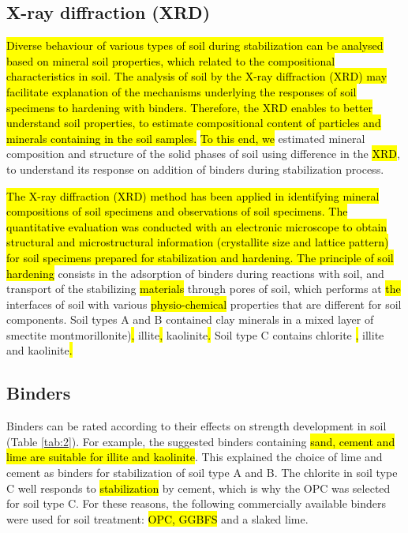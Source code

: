 \documentclass[electronics,article,submit,pdftex,moreauthors]{Definitions/mdpi}
\begin{document}

\subsection{X-ray diffraction (XRD)}
\hl{Diverse behaviour of various types of soil during stabilization can be analysed based on mineral soil properties, which related to the compositional characteristics in soil. The analysis of soil by the X-ray diffraction (XRD) may facilitate explanation of the mechanisms underlying the responses of soil specimens to hardening with binders. Therefore, the XRD enables to better understand soil properties, to estimate compositional content of particles and minerals containing in the soil samples. }\hl{To this end, we} estimated\hl{ }mineral composition and structure of the solid phases of soil\hl{ }using\hl{ }difference in the \hl{XRD}, to understand its response on addition of binders during stabilization process. 

\hl{The X-ray diffraction (XRD) method has been applied in identifying mineral compositions of soil specimens and observations of soil specimens. The quantitative evaluation was conducted with an electronic microscope to obtain structural and microstructural information (crystallite size and lattice pattern) for soil specimens prepared for stabilization and hardening. The principle of soil hardening} consists in the adsorption of binders during reactions with soil, and transport of the\hl{ }stabilizing \hl{materials} through pores of soil, which performs at \hl{the} interfaces of soil with various \hl{physio-chemical} properties that are different for\hl{ }soil components. Soil types A and B contained clay minerals in a mixed layer of smectite\hl{ }montmorillonite)\hl{, }illite\hl{, }kaolinite\hl{. }Soil type C contains chlorite \hl{, }illite\hl{ }and kaolinite\hl{.} 

\subsection{Binders}
Binders can be rated according to their effects on strength development in soil (Table \ref{tab:2}). For example, the suggested binders containing \hl{sand, cement and lime are suitable  for illite and kaolinite}. This explained the choice of lime and cement as binders for stabilization of soil type A and B. The chlorite\hl{ }in soil type C well responds to\hl{ stabilization }by cement, which is why the OPC was selected for soil type C. For these reasons, the following commercially available binders were used for soil treatment: \hl{OPC, GGBFS} and a slaked lime. 
\end{document}
